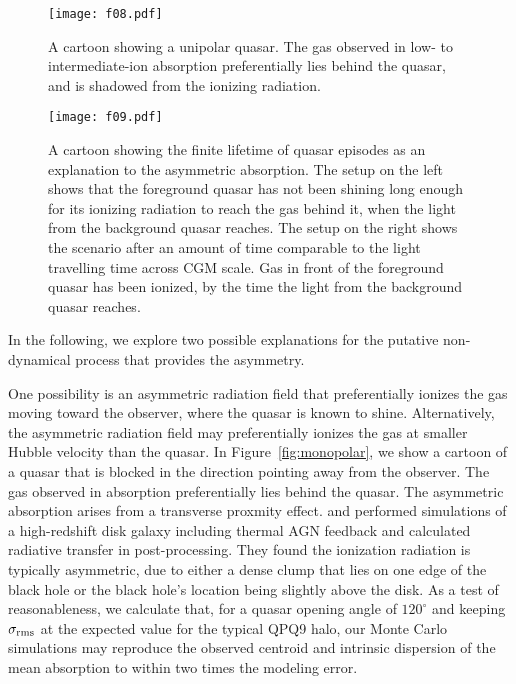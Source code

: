 \documentclass[iop]{emulateapj}
\begin{document}
\begin{figure*}[!th]
\begin{minipage}[!bp]{0.28\textwidth}
\texttt{[image: f08.pdf]}
\caption{A cartoon showing a unipolar quasar. The gas observed in low- to intermediate-ion 
absorption preferentially lies behind the quasar, and is shadowed from the ionizing radiation. 
}
\label{fig:monopolar}
\end{minipage}%
\hspace{0.3in}
\begin{minipage}[!bp]{0.67\textwidth}
\texttt{[image: f09.pdf]}
\caption{A cartoon showing the finite lifetime of quasar episodes as an explanation to the 
asymmetric absorption. The setup on the left shows that the foreground quasar has not been shining 
long enough for its ionizing radiation to reach the gas behind it, when the light from the 
background quasar reaches. The setup on the right shows the scenario after an amount of time 
comparable to the light travelling time across CGM scale. Gas in front of the foreground quasar 
has been ionized, by the time the light from the background quasar reaches. 
}
\label{fig:lighttravel}
\end{minipage}
\end{figure*}

In the following, we explore two possible explanations for the putative non-dynamical process that 
provides the asymmetry. 

One possibility is an asymmetric radiation field that preferentially ionizes the gas moving toward 
the observer, where the quasar is known to shine. Alternatively, the asymmetric radiation field 
may preferentially ionizes the gas at smaller Hubble velocity than the quasar. In 
Figure~\ref{fig:monopolar}, we show a cartoon of a quasar that is blocked in the direction 
pointing away from the observer. The gas observed in absorption preferentially lies behind the 
quasar. The asymmetric absorption arises from a transverse proxmity effect. 
\cite{Roos+15} and \cite{GaborBournaud14} performed simulations of a high-redshift disk galaxy 
including thermal AGN feedback and calculated radiative transfer in post-processing. They found 
the ionization radiation is typically asymmetric, due to either a dense clump that lies on one 
edge of the black hole or the black hole's location being slightly above the disk.
As a test of reasonableness, we calculate that, for a quasar opening angle of $120^\circ$ and
keeping $\sigma_{\rm rms}$ at the expected value for the typical QPQ9 halo, our Monte Carlo
simulations may reproduce the observed centroid and intrinsic dispersion of the  mean
absorption to within two times the modeling error.
\end{document}
